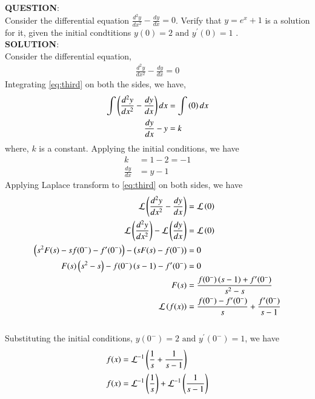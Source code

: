 \documentclass[journal]{IEEEtran}
\begin{document}
\textbf{QUESTION}:\\
Consider the differential equation $\frac{d^2 y}{d x^2} - \frac{dy}{dx} = 0$. Verify that $y = e^x + 1$ is a solution for it, given the initial condtitions $y(0) = 2 \text{ and } y^{\prime} (0) = 1$ . \\
\textbf{SOLUTION}: \\
Consider the differential equation, 
\begin{align} 
	\frac{d^2 y}{d x^2} - \frac{dy}{dx} = 0 \label{eq:third} 
\end{align}
Integrating \eqref{eq:third} on both the sides, we have, 
\begin{align}
	\int \left(\frac{d^2 y}{d x^2} - \frac{dy}{dx}\right) dx &= \int \left(0\right) dx \\
	\frac{dy}{dx} - y &= k  
\end{align}
where, $k$ is a constant. Applying the initial conditions, we have
\begin{align}
	k &= 1-2 = -1 \\
	\frac{dy}{dx} &= y - 1 \label{eq:fourth}
\end{align}
Applying Laplace transform to \eqref{eq:third} on both sides, we have \\
\begin{align}
	\mathcal{L} \left(\frac{d^2 y}{d x^2} - \frac{dy}{dx}\right) &= \mathcal{L} \left(0\right) \\
	\mathcal{L} \left(\frac{d^2 y}{d x^2}\right) - \mathcal{L} \left(\frac{dy}{dx}\right) &= \mathcal{L} \left(0\right) \\
	\left(s^2 F(s) - s f(0^{-}) - f^{\prime}(0^{-})\right) - \left(s F(s) - f(0^{-})\right) &= 0 \\
	F(s) \left(s^2 - s\right) - f(0^{-}) \left(s-1\right) - f^{\prime}(0^{-}) &= 0 \\
	F(s) &= \frac{f(0^{-}) \left(s-1\right) + f^{\prime}(0^{-})}{s^2 - s} \\
	\mathcal{L} \left(f(x)\right) &= \frac{f(0^{-}) - f^{\prime}(0^{-})}{s} + \frac{f^{\prime}(0^{-})}{s-1}  
\end{align} \\
Substituting the initial conditions, $y(0^{-}) = 2 \text{ and } y^{\prime} (0^{-}) = 1$, we have \\ 
\begin{align}
	f(x) &= \mathcal{L}^{-1} \left(\frac{1}{s} + \frac{1}{s-1}\right) \\
	f(x) &= \mathcal{L}^{-1} \left(\frac{1}{s}\right) + \mathcal{L}^{-1} \left(\frac{1}{s-1}\right)  
\end{align}
\end{document}
